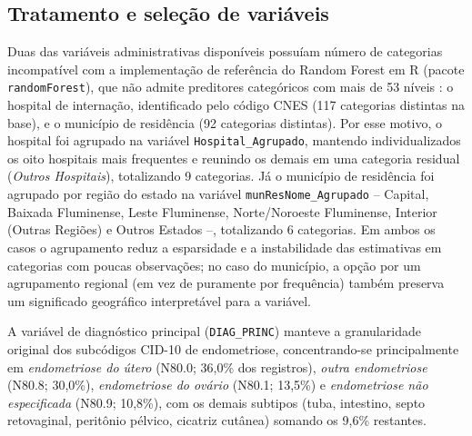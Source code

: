 \documentclass[12pt,a4paper]{article}
\begin{document}
\subsection{Tratamento e seleção de variáveis}
\label{sec:tratamento_variaveis}

Duas das variáveis administrativas disponíveis possuíam número de categorias incompatível com a implementação de referência do Random Forest em R (pacote \texttt{randomForest}), que não admite preditores categóricos com mais de 53 níveis \cite{liaw2002}: o hospital de internação, identificado pelo código CNES (117 categorias distintas na base), e o município de residência (92 categorias distintas). Por esse motivo, o hospital foi agrupado na variável \texttt{Hospital\_Agrupado}, mantendo individualizados os oito hospitais mais frequentes e reunindo os demais em uma categoria residual (\emph{Outros Hospitais}), totalizando 9 categorias. Já o município de residência foi agrupado por região do estado na variável \texttt{munResNome\_Agrupado} -- Capital, Baixada Fluminense, Leste Fluminense, Norte/Noroeste Fluminense, Interior (Outras Regiões) e Outros Estados --, totalizando 6 categorias. Em ambos os casos o agrupamento reduz a esparsidade e a instabilidade das estimativas em categorias com poucas observações; no caso do município, a opção por um agrupamento regional (em vez de puramente por frequência) também preserva um significado geográfico interpretável para a variável.

A variável de diagnóstico principal (\texttt{DIAG\_PRINC}) manteve a granularidade original dos subcódigos CID-10 de endometriose, concentrando-se principalmente em \emph{endometriose do útero} (N80.0; 36,0\% dos registros), \emph{outra endometriose} (N80.8; 30,0\%), \emph{endometriose do ovário} (N80.1; 13,5\%) e \emph{endometriose não especificada} (N80.9; 10,8\%), com os demais subtipos (tuba, intestino, septo retovaginal, peritônio pélvico, cicatriz cutânea) somando os 9,6\% restantes.
\end{document}
